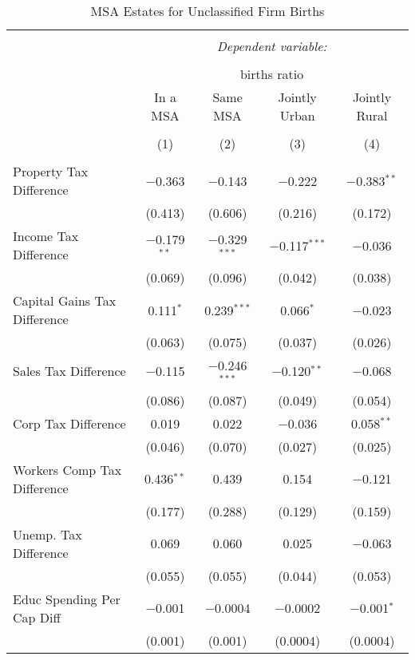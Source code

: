 
\begin{table}[!htbp] \centering 
  \caption{MSA Estates for  Unclassified Firm Births} 
  \label{} 
\begin{tabular}{@{\extracolsep{5pt}}lcccc} 
\\[-1.8ex]\hline 
\hline \\[-1.8ex] 
 & \multicolumn{4}{c}{\textit{Dependent variable:}} \\ 
\cline{2-5} 
\\[-1.8ex] & \multicolumn{4}{c}{births ratio} \\ 
 & In a MSA & Same MSA & Jointly Urban & Jointly Rural \\ 
\\[-1.8ex] & (1) & (2) & (3) & (4)\\ 
\hline \\[-1.8ex] 
 Property Tax Difference & $-$0.363 & $-$0.143 & $-$0.222 & $-$0.383$^{**}$ \\ 
  & (0.413) & (0.606) & (0.216) & (0.172) \\ 
  Income Tax Difference & $-$0.179$^{**}$ & $-$0.329$^{***}$ & $-$0.117$^{***}$ & $-$0.036 \\ 
  & (0.069) & (0.096) & (0.042) & (0.038) \\ 
  Capital Gains Tax Difference & 0.111$^{*}$ & 0.239$^{***}$ & 0.066$^{*}$ & $-$0.023 \\ 
  & (0.063) & (0.075) & (0.037) & (0.026) \\ 
  Sales Tax Difference & $-$0.115 & $-$0.246$^{***}$ & $-$0.120$^{**}$ & $-$0.068 \\ 
  & (0.086) & (0.087) & (0.049) & (0.054) \\ 
  Corp Tax Difference & 0.019 & 0.022 & $-$0.036 & 0.058$^{**}$ \\ 
  & (0.046) & (0.070) & (0.027) & (0.025) \\ 
  Workers Comp Tax Difference & 0.436$^{**}$ & 0.439 & 0.154 & $-$0.121 \\ 
  & (0.177) & (0.288) & (0.129) & (0.159) \\ 
  Unemp. Tax Difference & 0.069 & 0.060 & 0.025 & $-$0.063 \\ 
  & (0.055) & (0.055) & (0.044) & (0.053) \\ 
  Educ Spending Per Cap Diff & $-$0.001 & $-$0.0004 & $-$0.0002 & $-$0.001$^{*}$ \\ 
  & (0.001) & (0.001) & (0.0004) & (0.0004) \\ 

\end{tabular}
\end{table}
